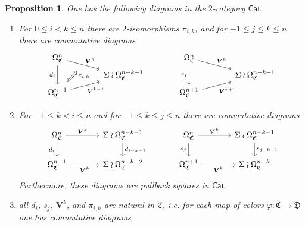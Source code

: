 \documentclass[a4paper,10pt
]{article}%
\numberwithin{equation}{section}
\numberwithin{figure}{section}
\newtheorem{proposition}[equation]{Proposition}%
\theoremstyle{definition} %
\newcommand{\1}{\ensuremath{\mathbbm 1}}%
\begin{document}
\begin{proposition}\label{CATDIAG PROP}
	One has the following diagrams in the $2$-category
	$\mathsf{Cat}$.
	\begin{enumerate}[label = (\roman*)]
		\item
		For $0\leq i < k \leq n$ there are $2$-isomorphisms  $\pi_{i,k}$,
		and for $-1 \leq j \leq k \leq n$ there are commutative diagrams
		\begin{equation}
		\begin{tikzcd}[row sep = 2pt, column sep = 35pt]
		\Omega_{\mathfrak{C}}^n
		\arrow{dr}[swap,name=U]{}{\boldsymbol{V}^k} \arrow{dd}[swap]{d_i} &
		&
		\Omega_{\mathfrak{C}}^n
		\arrow{dr}{\boldsymbol{V}^k} \arrow{dd}[swap]{s_j} &
		\\
		& \Sigma \wr \Omega_{\mathfrak{C}}^{n-k-1}
		&
		& \Sigma \wr \Omega_{\mathfrak{C}}^{n-k-1}
		\\
		|[alias=V]|
		\Omega_{\mathfrak{C}}^{n-1} \arrow{ur}[swap]{\boldsymbol{V}^{k-1}} &
		&
		\Omega_{\mathfrak{C}}^{n+1} \arrow{ur}[swap]{\boldsymbol{V}^{k+1}} &
		\arrow[Leftrightarrow, from=V, to=U,shorten >=0.15cm,shorten <=0.15cm
		,swap, near end, "\pi_{i,k}"
		]
		\end{tikzcd}
		\end{equation}
		\item
		For $-1 \leq k < i \leq n$ and for $-1 \leq k \leq j \leq n$
		there are commutative diagrams
		\begin{equation}
		\begin{tikzcd}[row sep = 8pt, column sep = 35pt]
		\Omega^n_{\mathfrak{C}}
		\arrow{r}[swap,name=U]{}{\boldsymbol{V}^k} \arrow{dd}[swap]{d_i} &
		\Sigma \wr \Omega^{n-k-1}_{\mathfrak{C}} \ar{dd}{d_{i-k-1}}
		&
		\Omega^n_{\mathfrak{C}}
		\arrow{r}{\boldsymbol{V}^k} \arrow{dd}[swap]{s_j} &
		\Sigma \wr \Omega^{n-k-1}_{\mathfrak{C}} \ar{dd}{s_{j-k-1}}
		\\
		\\
		|[alias=V]|
		\Omega^{n-1}_{\mathfrak{C}} \arrow{r}[swap]{\boldsymbol{V}^{k}} &
		\Sigma \wr \Omega^{n-k-2}_{\mathfrak{C}}
		&
		\Omega^{n+1}_{\mathfrak{C}} \arrow{r}[swap]{\boldsymbol{V}^{k}} &
		\Sigma \wr \Omega^{n-k}_{\mathfrak{C}}
		\end{tikzcd}
		\end{equation}
		Furthermore, these diagrams are pullback squares in $\mathsf{Cat}$.
		\item 
		all $d_i$, $s_j$, $\boldsymbol{V}^k$, and $\pi_{i,k}$
		are natural in $\mathfrak{C}$, i.e. for each map of colors
		$\varphi \colon \mathfrak{C} \to \mathfrak{D}$ one has commutative diagrams

\end{enumerate}
\end{proposition}
\end{document}
